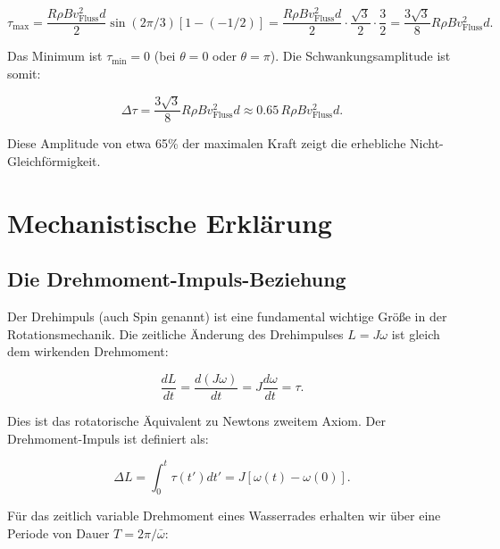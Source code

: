 \documentclass[a4paper,12pt]{article}
\theoremstyle{definition}
\begin{document}
\begin{equation}
  \tau_{\max} = \frac{R \rho B v_{\text{Fluss}}^2 d}{2} \sin(2\pi/3)[1-(-1/2)] = \frac{R \rho B v_{\text{Fluss}}^2 d}{2} \cdot \frac{\sqrt{3}}{2} \cdot \frac{3}{2}
  = \frac{3\sqrt{3}}{8} R \rho B v_{\text{Fluss}}^2 d.
  \label{eq:tau_max_wert}
\end{equation}

Das Minimum ist $\tau_{\min} = 0$ (bei $\theta = 0$ oder $\theta = \pi$). Die Schwankungsamplitude ist somit:

\begin{equation}
  \Delta \tau = \frac{3\sqrt{3}}{8} R \rho B v_\text{Fluss}^2 d \approx 0.65 \, R \rho B v_\text{Fluss}^2 d.
  \label{eq:delta_tau_wert}
\end{equation}

Diese Amplitude von etwa 65\% der maximalen Kraft zeigt die erhebliche Nicht-Gleichförmigkeit.

\section{Mechanistische Erklärung}

\subsection{Die Drehmoment-Impuls-Beziehung}

Der Drehimpuls (auch Spin genannt) ist eine fundamental wichtige Größe in der Rotationsmechanik. Die zeitliche Änderung des Drehimpulses $L = J\omega$ ist gleich dem wirkenden Drehmoment:

\begin{equation}
  \frac{dL}{dt} = \frac{d(J\omega)}{dt} = J\frac{d\omega}{dt} = \tau.
  \label{eq:drehimpuls_change}
\end{equation}

Dies ist das rotatorische Äquivalent zu Newtons zweitem Axiom. Der Drehmoment-Impuls ist definiert als:

\begin{equation}
  \Delta L = \int_0^t \tau(t') dt' = J[\omega(t) - \omega(0)].
  \label{eq:drehmoment_impuls}
\end{equation}

Für das zeitlich variable Drehmoment eines Wasserrades erhalten wir über eine Periode von Dauer $T = 2\pi/\bar{\omega}$:
\end{document}

